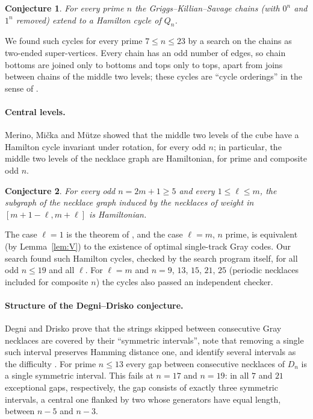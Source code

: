 \documentclass[11pt]{article}
\newtheorem{conjecture}{Conjecture}
\begin{document}
\begin{conjecture}\label{conj:D}
For every prime $n$ the Griggs--Killian--Savage chains (with $0^n$ and $1^n$ removed) extend to a Hamilton cycle of
$Q_n$.
\end{conjecture}

We found such cycles for every prime $7\le n\le 23$ by a search on the chains as two-ended super-vertices. Every chain
has an odd number of edges, so chain bottoms are joined only to bottoms and tops only to tops, apart from joins between
chains of the middle two levels; these cycles are ``cycle orderings'' in the sense of \cite{GMM}.

\paragraph{Central levels.} Merino, Mi\v{c}ka and M\"utze \cite{MMM} showed that the middle two levels of the cube have a
Hamilton cycle invariant under rotation, for every odd $n$; in particular, the middle two levels of the necklace graph
are Hamiltonian, for prime and composite odd $n$.

\begin{conjecture}\label{conj:H}
For every odd $n=2m+1\ge5$ and every $1\le\ell\le m$, the subgraph of the necklace graph induced by the necklaces of
weight in $[m+1-\ell,m+\ell]$ is Hamiltonian.
\end{conjecture}

The case $\ell=1$ is the theorem of \cite{MMM}, and the case $\ell=m$, $n$ prime, is equivalent (by
Lemma~\ref{lem:V}) to the existence of optimal single-track Gray codes. Our search found such Hamilton cycles, checked by the search
program itself, for all odd $n\le19$ and all $\ell$. For $\ell=m$ and $n=9$, $13$, $15$, $21$, $25$ (periodic necklaces
included for composite $n$) the cycles also passed an independent checker.

\paragraph{Structure of the Degni--Drisko conjecture.} Degni and Drisko prove that the strings skipped between
consecutive Gray necklaces are covered by their ``symmetric intervals'', note that removing a single such interval
preserves Hamming distance one, and identify several intervals as the difficulty \cite[Section 8]{DD07}. For prime
$n\le13$ every gap between consecutive necklaces of $D_n$ is a single symmetric interval. This fails at $n=17$ and
$n=19$: in all $7$ and $21$ exceptional gaps, respectively, the gap consists of exactly three symmetric intervals, a
central one flanked by two whose generators have equal length, between $n-5$ and $n-3$.
\end{document}
